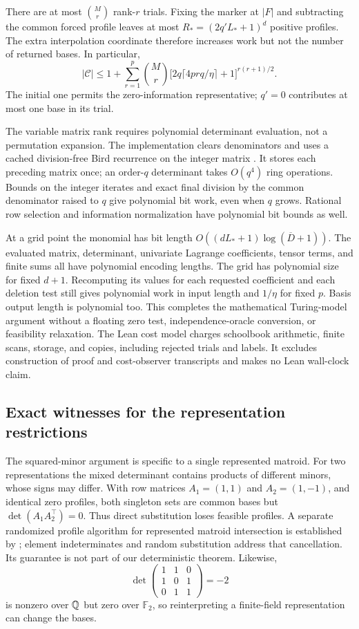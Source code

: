 There are at most $\binom Mr$ rank-$r$ trials. Fixing the marker at $|F|$
and subtracting the common forced profile leaves at most
$R_*=(2q'L_*+1)^d$ positive profiles. The extra interpolation coordinate
therefore increases work but not the number of returned bases. In particular,
\[
 |\mathcal C|\le1+\sum_{r=1}^p\binom Mr
 \bigl[2q\lceil4prq/\eta\rceil+1\bigr]^{r(r+1)/2}.
\]
The initial one permits the zero-information representative; $q'=0$
contributes at most one base in its trial.

The variable matrix rank requires polynomial determinant evaluation,
not a permutation expansion. The implementation clears denominators and
uses a cached division-free Bird recurrence on the integer matrix
\citep{Bird2011}.
It stores each preceding matrix once; an order-$q$ determinant takes
$O(q^4)$ ring operations. Bounds on the integer iterates and exact final
division by the common denominator raised to $q$ give polynomial bit
work, even when $q$ grows. Rational row selection and information
normalization have polynomial bit bounds as well.

At a grid point the monomial has bit length
$O((dL_*+1)\log(\overline D+1))$. The evaluated matrix, determinant,
univariate Lagrange coefficients, tensor terms, and finite sums all have
polynomial encoding lengths. The grid has polynomial size for fixed
$d+1$. Recomputing its values for each requested coefficient and each
deletion test still gives polynomial work in input length and $1/\eta$
for fixed $p$. Basis output length is polynomial too. This completes the
mathematical Turing-model argument without a floating zero test,
independence-oracle conversion, or feasibility relaxation.
The Lean cost model charges schoolbook arithmetic, finite scans, storage,
and copies, including rejected trials and labels. It excludes construction
of proof and cost-observer transcripts and makes no Lean wall-clock claim.

\subsection{Exact witnesses for the representation restrictions}
The squared-minor argument is specific to a single represented matroid.
For two representations the mixed determinant contains products of different
minors, whose signs may differ. With row matrices $A_1=(1,1)$ and
$A_2=(1,-1)$, and identical zero profiles, both singleton sets are common
bases but $\det(A_1A_2^\top)=0$. Thus direct substitution loses feasible
profiles. A separate randomized profile algorithm for represented matroid
intersection is established by \citet[Section 3]{Berstein2010}; element
indeterminates and random substitution address that cancellation. Its
guarantee is not part of our deterministic theorem. Likewise,
\[
 \det\begin{pmatrix}1&1&0\\1&0&1\\0&1&1\end{pmatrix}=-2
\]
is nonzero over $\mathbb Q$ but zero over $\mathbb F_2$, so reinterpreting a
finite-field representation can change the bases.


